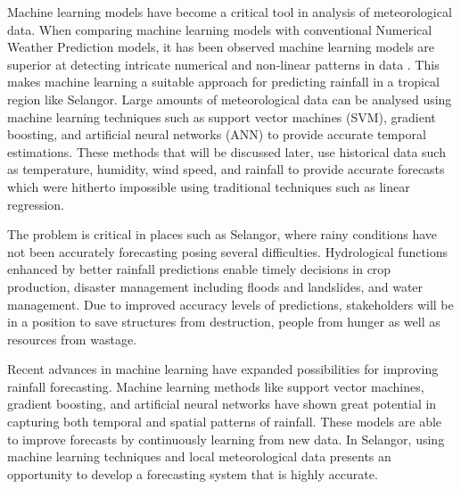 \documentclass{article}
\begin{document}
Machine learning models have become a critical tool in analysis of meteorological data. When
comparing machine learning models with conventional Numerical Weather Prediction models,
it has been observed machine learning models are superior at detecting intricate numerical and
non-linear patterns in data \cite{bouallegue_et_al_2024}. This makes machine learning a suitable
approach for predicting rainfall in a tropical region like Selangor. Large amounts of
meteorological data can be analysed using machine learning techniques such as support vector
machines (SVM), gradient boosting, and artificial neural networks (ANN) to provide accurate
temporal estimations. These methods that will be discussed later, use historical data such as
temperature, humidity, wind speed, and rainfall to provide accurate forecasts which were
hitherto impossible using traditional techniques such as linear regression.

The problem is critical in places such as Selangor, where rainy conditions have not been
accurately forecasting posing several difficulties. Hydrological functions enhanced by better
rainfall predictions enable timely decisions in crop production, disaster management including
floods and landslides, and water management. Due to improved accuracy levels of predictions,
stakeholders will be in a position to save structures from destruction, people from hunger as
well as resources from wastage.

Recent advances in machine learning have expanded possibilities for improving rainfall
forecasting. Machine learning methods like support vector machines, gradient boosting, and
artificial neural networks have shown great potential in capturing both temporal and spatial
patterns of rainfall. These models are able to improve forecasts by continuously learning from
new data. In Selangor, using machine learning techniques and local meteorological data
presents an opportunity to develop a forecasting system that is highly accurate.
\end{document}
